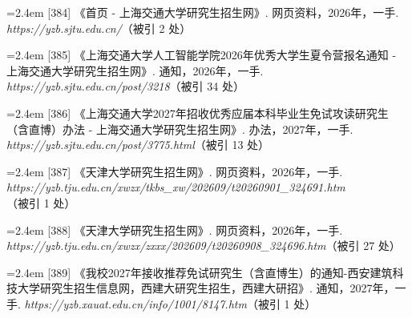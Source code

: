 {\nopagebreak\vspace{1pt}
\noindent\hangindent=2.4em \label{src:S0513}{\color{cAccent}[384]} 《首页 - 上海交通大学研究生招生网》. 网页资料，2026年，一手. \textit{https://yzb.sjtu.edu.cn/}（被引 2 处）\par
\vspace{0.6pt}
\noindent\hangindent=2.4em \label{src:S0514}{\color{cAccent}[385]} 《上海交通大学人工智能学院2026年优秀大学生夏令营报名通知 - 上海交通大学研究生招生网》. 通知，2026年，一手. \textit{https://yzb.sjtu.edu.cn/post/3218}（被引 34 处）\par
\vspace{0.6pt}
\noindent\hangindent=2.4em \label{src:S0515}{\color{cAccent}[386]} 《上海交通大学2027年招收优秀应届本科毕业生免试攻读研究生（含直博）办法 - 上海交通大学研究生招生网》. 办法，2027年，一手. \textit{https://yzb.sjtu.edu.cn/post/3775.html}（被引 13 处）\par
\vspace{0.6pt}
\vspace{3.5pt}\par
\nopagebreak\vspace{1pt}
\noindent\hangindent=2.4em \label{src:S0516}{\color{cAccent}[387]} 《天津大学研究生招生网》. 网页资料，2026年，一手. \textit{https://yzb.tju.edu.cn/xwzx/tkbs\_xw/202609/t20260901\_324691.htm}（被引 1 处）\par
\vspace{0.6pt}
\noindent\hangindent=2.4em \label{src:S0520}{\color{cAccent}[388]} 《天津大学研究生招生网》. 网页资料，2026年，一手. \textit{https://yzb.tju.edu.cn/xwzx/zxxx/202609/t20260908\_324696.htm}（被引 27 处）\par
\vspace{0.6pt}
\vspace{3.5pt}\par
\nopagebreak\vspace{1pt}
\noindent\hangindent=2.4em \label{src:S0522}{\color{cAccent}[389]} 《我校2027年接收推荐免试研究生（含直博生）的通知-西安建筑科技大学研究生招生信息网，西建大研究生招生，西建大研招》. 通知，2027年，一手. \textit{https://yzb.xauat.edu.cn/info/1001/8147.htm}（被引 1 处）\par
\vspace{0.6pt}
\vspace{3.5pt}\par
}
